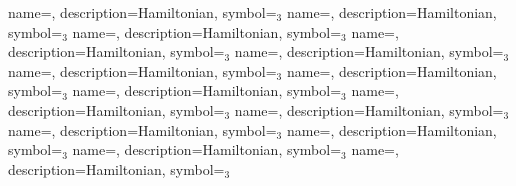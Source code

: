 {name={{\hamiltonian}}, %
 description={Hamiltonian}, %
 symbol={\hamiltonian$_3$} %
}
{name={{\hamiltonian}}, %
 description={Hamiltonian}, %
 symbol={\hamiltonian$_3$} %
}
{name={{\hamiltonian}}, %
 description={Hamiltonian}, %
 symbol={\hamiltonian$_3$} %
}
{name={{\hamiltonian}}, %
 description={Hamiltonian}, %
 symbol={\hamiltonian$_3$} %
}
{name={{\hamiltonian}}, %
 description={Hamiltonian}, %
 symbol={\hamiltonian$_3$} %
}
{name={{\hamiltonian}}, %
 description={Hamiltonian}, %
 symbol={\hamiltonian$_3$} %
}
{name={{\hamiltonian}}, %
 description={Hamiltonian}, %
 symbol={\hamiltonian$_3$} %
}
{name={{\hamiltonian}}, %
 description={Hamiltonian}, %
 symbol={\hamiltonian$_3$} %
}
{name={{\hamiltonian}}, %
 description={Hamiltonian}, %
 symbol={\hamiltonian$_3$} %
}
{name={{\hamiltonian}}, %
 description={Hamiltonian}, %
 symbol={\hamiltonian$_3$} %
}
{name={{\hamiltonian}}, %
 description={Hamiltonian}, %
 symbol={\hamiltonian$_3$} %
}
{name={{\hamiltonian}}, %
 description={Hamiltonian}, %
 symbol={\hamiltonian$_3$} %
}
{name={{\hamiltonian}}, %
 description={Hamiltonian}, %
 symbol={\hamiltonian$_3$} %
}
{name={{\hamiltonian}}, %
 description={Hamiltonian}, %
 symbol={\hamiltonian$_3$} %
}
